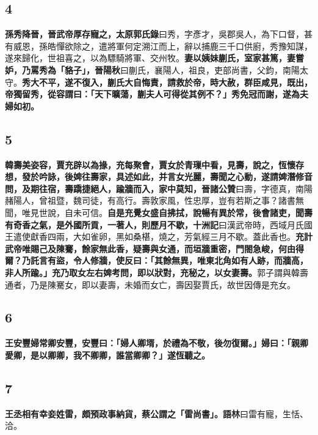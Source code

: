 \subsection*{4}

\textbf{孫秀降晉，晉武帝厚存寵之，}{\footnotesize \textbf{太原郭氏錄}曰秀，字彥才，吳郡吳人，為下口督，甚有威恩，孫皓憚欲除之，遣將軍何定溯江而上，辭以捕鹿三千口供廚，秀豫知謀，遂來歸化，世祖喜之，以為驃騎將軍、交州牧。}\textbf{妻以姨妹蒯氏，室家甚篤，妻嘗妒，乃罵秀為「貉子」，}{\footnotesize \textbf{晉陽秋}曰蒯氏，襄陽人，祖良，吏部尚書，父鈞，南陽太守。}\textbf{秀大不平，遂不復入，蒯氏大自悔責，請救於帝，時大赦，群臣咸見，既出，帝獨留秀，從容謂曰：「天下曠蕩，蒯夫人可得從其例不？」秀免冠而謝，遂為夫婦如初。}

\subsection*{5}

\textbf{韓壽美姿容，賈充辟以為掾，充每聚會，賈女於青璅中看，見壽，說之，恆懷存想，發於吟詠，後婢往壽家，具述如此，并言女光麗，壽聞之心動，遂請婢潛修音問，及期往宿，壽蹻捷絕人，踰牆而入，家中莫知，}{\footnotesize \textbf{晉諸公贊}曰壽，字德真，南陽赭陽人，曾祖暨，魏司徒，有高行。壽敦家風，性忠厚，豈有若斯之事？諸書無聞，唯見世說，自未可信。}\textbf{自是充覺女盛自拂拭，說暢有異於常，後會諸吏，聞壽有奇香之氣，是外國所貢，一著人，則歷月不歇，}{\footnotesize \textbf{十洲記}曰漢武帝時，西域月氏國王遣使獻香四兩，大如雀卵，黑如桑椹，燒之，芳氣經三月不歇。蓋此香也。}\textbf{充計武帝唯賜己及陳騫，餘家無此香，疑壽與女通，而垣牆重密，門閤急峻，何由得爾？乃託言有盜，令人修牆，使反曰：「其餘無異，唯東北角如有人跡，而牆高，非人所踰。」充乃取女左右婢考問，即以狀對，充秘之，以女妻壽。}{\footnotesize 郭子謂與韓壽通者，乃是陳騫女，即以妻壽，未婚而女亡，壽因娶賈氏，故世因傳是充女。}

\subsection*{6}

\textbf{王安豐婦常卿安豐，安豐曰：「婦人卿壻，於禮為不敬，後勿復爾。」婦曰：「親卿愛卿，是以卿卿，我不卿卿，誰當卿卿？」遂恆聽之。}

\subsection*{7}

\textbf{王丞相有幸妾姓雷，頗預政事納貨，蔡公謂之「雷尚書」。}{\footnotesize \textbf{語林}曰雷有寵，生恬、洽。}